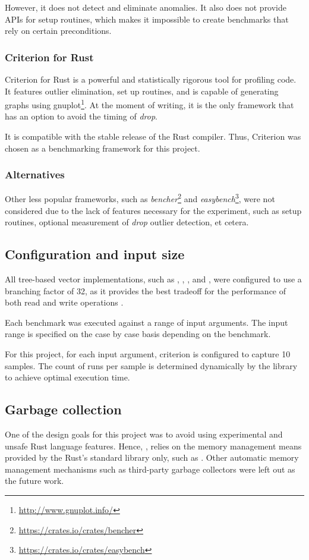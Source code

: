 However, it does not detect and eliminate anomalies. It also does not provide APIs for setup routines, which makes it impossible to create benchmarks that rely on certain preconditions.

\subsubsection*{Criterion for Rust}
Criterion for Rust is a powerful and statistically rigorous tool for profiling code. It features outlier elimination, set up routines, and is capable of generating graphs using gnuplot\footnote{\url{http://www.gnuplot.info/}}. At the moment of writing, it is the only framework that has an option to avoid the timing of \emph{drop}.

It is compatible with the stable release of the Rust compiler. Thus, Criterion was chosen as a benchmarking framework for this project.

\subsubsection*{Alternatives}
Other less popular frameworks, such as \emph{bencher}\footnote{\url{https://crates.io/crates/bencher}} and \emph{easybench}\footnote{\url{https://crates.io/crates/easybench}}, were not considered due to the lack of features necessary for the experiment, such as setup routines, optional measurement of \emph{drop} outlier detection, et cetera.

\subsection{Configuration and input size}
All tree-based vector implementations, such as \rbvec{}, \rrbvec{}, \pvec{}, and \imrsvec{}, were configured to use a branching factor of 32, as it provides the best tradeoff for the performance of both read and write operations \cite{efficient-immutable-vectors}.

Each benchmark was executed against a range of input arguments. The input range is specified on the case by case basis depending on the benchmark.

For this project, for each input argument, criterion is configured to capture 10 samples. The count of runs per sample is determined dynamically by the library to achieve optimal execution time.

\subsection{Garbage collection}
One of the design goals for this project was to avoid using experimental and unsafe Rust language features. Hence, \pvecrs{}, relies on the memory management means provided by the Rust's standard library only, such as \rc{}. Other automatic memory management mechanisms such as third-party garbage collectors were left out as the future work.

